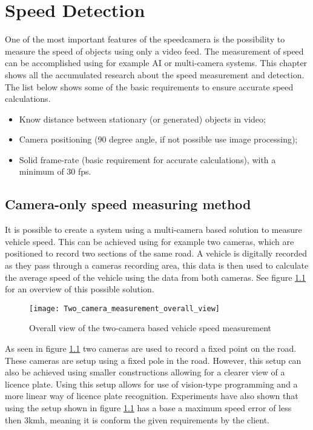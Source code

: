 \chapter{Speed Detection}
\label{chap:speed-detection}

One of the most important features of the speedcamera is the possibility to measure the speed of objects using only a video feed. The measurement of 
speed can be accomplished using for example AI or multi-camera systems. This chapter shows all the accumulated research about the speed measurement 
and detection. The list below shows some of the basic requirements to ensure accurate speed calculations.

\begin{itemize}
    \item Know distance between stationary (or generated) objects in video;
    \item Camera positioning (90 degree angle, if not possible use image processing);
    \item Solid frame-rate (basic requirement for accurate calculations), with a minimum of 30 fps.
\end{itemize}

\section{Camera-only speed measuring method}
It is possible to create a system using a multi-camera based solution to measure vehicle speed. This can be achieved using for example two cameras,
which are positioned to record two sections of the same road. A vehicle is digitally recorded as they pass through a cameras recording area, this data
is then used to calculate the average speed of the vehicle using the data from both cameras. See figure \ref{fig:two_camera_measurement_overview} for 
an overview of this possible solution.

\begin{figure}[h]
    \caption{Overall view of the two-camera based vehicle speed measurement}
    \centering
    \texttt{[image: Two\_camera\_measurement\_overall\_view]}
    \label{fig:two_camera_measurement_overview}
\end{figure}

As seen in figure \ref{fig:two_camera_measurement_overview} two cameras are used to record a fixed point on the road. These cameras are setup using a
fixed pole in the road. However, this setup can also be achieved using smaller constructions allowing for a clearer view of a licence plate. Using 
this setup allows for use of vision-type programming and a more linear way of licence plate recognition. Experiments have also shown that using the 
setup shown in figure \ref{fig:two_camera_measurement_overview} has a base a maximum speed error of less then 3kmh, meaning it is conform the given
requirements by the client. 

